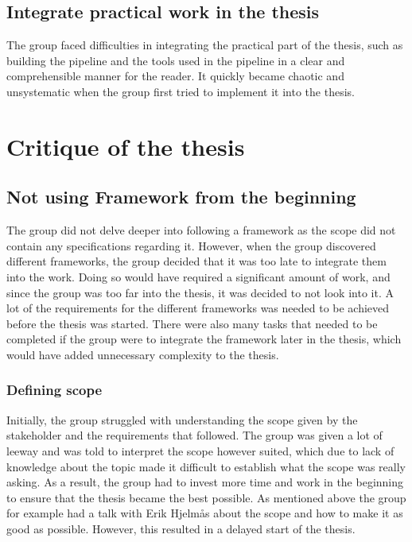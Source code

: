 \subsection{Integrate practical work in the thesis}%
The group faced difficulties in integrating the practical part of the thesis, such as building the pipeline and the tools used in the pipeline in a clear and comprehensible manner for the reader. It quickly became chaotic and unsystematic when the group first tried to implement it into the thesis. 

\section{Critique of the thesis}

\subsection{Not using Framework from the beginning}
The group did not delve deeper into following a framework as the scope did not contain any specifications regarding it. However, when the group discovered different frameworks, the group decided that it was too late to integrate them into the work. Doing so would have required a significant amount of work, and since the group was too far into the thesis, it was decided to not look into it. A lot of the requirements for the different frameworks was needed to be achieved before the thesis was started. There were also many tasks that needed to be completed if the group were to integrate the framework later in the thesis, which would have added unnecessary complexity to the thesis. 

\subsubsection{Defining scope}
Initially, the group struggled with understanding the scope given by the stakeholder and the requirements that followed. The group was given a lot of leeway and was told to interpret the scope however suited, which due to lack of knowledge about the topic made it difficult to establish what the scope was really asking. As a result, the group had to invest more time and work in the beginning to ensure that the thesis became the best possible. As mentioned above the group for example had a talk with Erik Hjelmås about the scope and how to make it as good as possible. However, this resulted in a delayed start of the thesis. 


